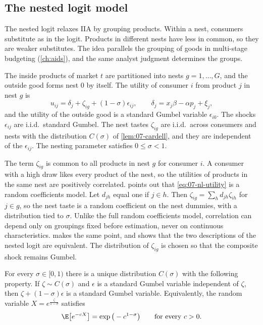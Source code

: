 \subsection{The nested logit model}\label{sec:07-nl-model}

The nested logit relaxes IIA by grouping products. Within a nest, consumers substitute as in the logit. Products in
different nests have less in common, so they are weaker substitutes. The idea parallels the grouping of goods in
multi-stage budgeting (\cref{ch:aids}), and the same analyst judgment determines the groups.

\begin{assumption}\label{asm:07-nl}
The inside products of market $t$ are partitioned into nests $g = 1, \dots, G$, and the outside good forms nest
$0$ by itself. The utility of consumer $i$ from product $j$ in nest $g$ is
\begin{equation}\label{eq:07-nl-utility}
u_{ij} = \delta_j + \zeta_{ig} + (1 - \sigma)\epsilon_{ij}, \qquad \delta_j = x_j\beta - \alpha p_j + \xi_j ,
\end{equation}
and the utility of the outside good is a standard Gumbel variable $\epsilon_{i0}$. The shocks $\epsilon_{ij}$ are
i.i.d.\ standard Gumbel. The nest tastes $\zeta_{ig}$ are i.i.d.\ across consumers and nests with the distribution
$C(\sigma)$ of \cref{lem:07-cardell}, and they are independent of the $\epsilon_{ij}$. The nesting parameter
satisfies $0 \le \sigma < 1$.
\end{assumption}

The term $\zeta_{ig}$ is common to all products in nest $g$ for consumer $i$. A consumer with a high draw likes
every product of the nest, so the utilities of products in the same nest are positively correlated.
\citet[p.~252]{Berry1994} points out that \eqref{eq:07-nl-utility} is a random coefficients model. Let $d_{jh}$
equal one if $j \in h$. Then $\zeta_{ig} = \sum_h d_{jh}\zeta_{ih}$ for $j \in g$, so the nest taste is a random
coefficient on the nest dummies, with a distribution tied to $\sigma$. Unlike the full random coefficients model, correlation can depend only on
groupings fixed before estimation, never on continuous characteristics.  makes the same
point, and \citet{Cardell1997} shows that the two descriptions of the nested logit are equivalent. The
distribution of $\zeta_{ig}$ is chosen so that the composite shock remains Gumbel.

\begin{lemma}\label{lem:07-cardell}
For every $\sigma \in [0, 1)$ there is a unique distribution $C(\sigma)$ with the following property. If
$\zeta \sim C(\sigma)$ and $\epsilon$ is a standard Gumbel variable independent of $\zeta$, then
$\zeta + (1 - \sigma)\epsilon$ is a standard Gumbel variable. Equivalently, the random variable
$X = e^{\frac{\zeta}{1-\sigma}}$ satisfies
\begin{equation}\label{eq:07-cardell-laplace}
\E\big[e^{-cX}\big] = \exp\big(-c^{1-\sigma}\big) \qquad \text{for every } c > 0 .
\end{equation}
\end{lemma}

